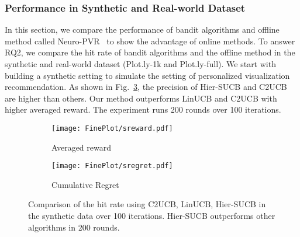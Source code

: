\subsubsection{Performance in Synthetic and Real-world Dataset}
In this section, we compare the performance of bandit algorithms and offline method called Neuro-PVR~\cite{qian_personalized_2021} to show the advantage of online methods. To answer RQ2, we compare the hit rate of bandit algorithms and the offline method in the synthetic and real-world dataset (Plot.ly-1k and Plot.ly-full). We start with building a synthetic setting to simulate the setting of personalized visualization recommendation. As shown in Fig.~\ref{fig:synthetic}, the precision of Hier-SUCB and C2UCB are higher than others. Our method outperforms LinUCB and C2UCB with higher averaged reward. The experiment runs 200 rounds over 100 iterations.
\begin{figure}
	\centering
	\begin{subfigure}{0.48\columnwidth}
		\centering
		\texttt{[image: FinePlot/sreward.pdf]}
		\caption{Averaged reward}
		\label{fig:sreward}
	\end{subfigure}
	\begin{subfigure}{0.48\columnwidth}
    	\centering
    	\texttt{[image: FinePlot/sregret.pdf]}
    	\caption{Cumulative Regret}
    	\label{fig:sregret}
	\end{subfigure}
 \vspace{-1em}
	\caption{Comparison of the hit rate using C2UCB, LinUCB, Hier-SUCB in the synthetic data over 100 iterations. Hier-SUCB outperforms other algorithms in 200 rounds.} 
	\label{fig:synthetic}
    \vspace{-1em}
\end{figure}

